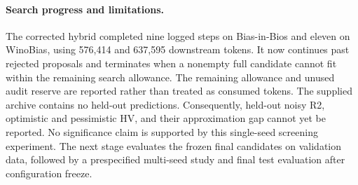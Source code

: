 \paragraph{Search progress and limitations.}
The corrected hybrid completed nine logged steps on Bias-in-Bios and eleven
on WinoBias, using 576,414 and 637,595 downstream tokens. It now continues
past rejected proposals and terminates when a nonempty full candidate cannot
fit within the remaining search allowance. The remaining allowance and
unused audit reserve are reported rather than treated as consumed tokens.
The supplied archive contains no held-out predictions. Consequently, held-out
noisy R2, optimistic and pessimistic HV, and their approximation gap cannot
yet be reported. No significance claim is supported by this single-seed
screening experiment. The next stage evaluates the frozen final candidates
on validation data, followed by a prespecified multi-seed study and final
test evaluation after configuration freeze.
